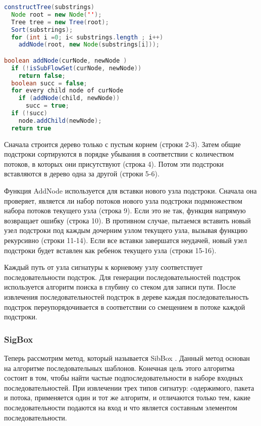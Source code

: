 \begin{lstlisting}[language=Java, caption=Алгоритм построения дерева подстрок]
constructTree(substrings)
  Node root = new Node('');
  Tree tree = new Tree(root);
  Sort(substrings);
  for (int i =0; i< substrings.length ; i++)
    addNode(root, new Node(substrings[i]));

boolean addNode(curNode, newNode )
  if (!isSubFlowSet(curNode, newNode))
    return false;
  boolean succ = false;
  for every child node of curNode
    if (addNode(child, newNode))
      succ = true;
  if (!succ)
    node.addChild(newNode);
  return true
\end{lstlisting}

Сначала строится дерево только с пустым корнем (строки 2-3).
Затем общие подстроки сортируются в порядке убывания в соответствии с количеством потоков, в которых они присутствуют (строка 4).
Потом эти подстроки вставляются в дерево одна за другой (строки 5-6).

Функция AddNode используется для вставки нового узла подстроки.
Сначала она проверяет, является ли набор потоков нового узла подстроки подмножеством набора потоков текущего узла (строка 9).
Если это не так, функция напрямую возвращает ошибку (строка 10).
В противном случае, пытаемся вставить новый узел подстроки под каждым дочерним узлом текущего узла, вызывая функцию рекурсивно (строки 11-14).
Если все вставки завершатся неудачей, новый узел подстроки будет вставлен как ребенок текущего узла (строки 15-16).

Каждый путь от узла сигнатуры к корневому узлу соответствует последовательности подстрок.
Для генерации последовательностей подстрок используется алгоритм поиска в глубину со стеком для записи пути.
После извлечения последовательностей подстрок в дереве каждая последовательность подстрок
переупорядочивается в соответствии со смещением в потоке каждой подстроки.

\subsubsection{SigBox}

Теперь рассмотрим метод, который называется SibBox \cite{shim2017sigbox}. Данный метод основан на алгоритме последовательных шаблонов.
Конечная цель этого алгоритма состоит в том, чтобы найти частые подпоследовательности в наборе входных последовательностей.
При извлечении трех типов сигнатур: cодержимого, пакета и потока, применяется один и тот же алгоритм, и отличаются только тем, какие последовательности
подаются на вход и что является составным элементом последовательности.

